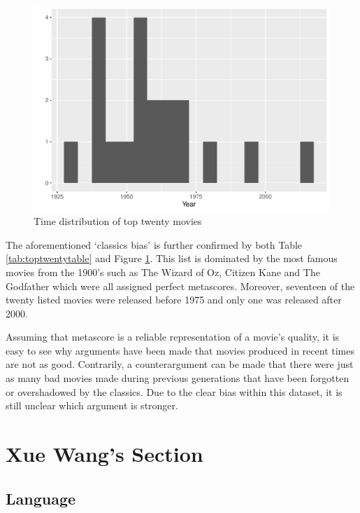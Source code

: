 \documentclass[11pt,a4paper,]{article}
\begin{document}
\begin{figure}
\centering
\includegraphics{Report_files/figure-latex/toptwentyhistogram-1.pdf}
\caption{\label{fig:toptwentyhistogram}Time distribution of top twenty movies}
\end{figure}

The aforementioned `classics bias' is further confirmed by both Table \ref{tab:toptwentytable} and Figure \ref{fig:toptwentyhistogram}. This list is dominated by the most famous movies from the 1900's such as The Wizard of Oz, Citizen Kane and The Godfather which were all assigned perfect metascores. Moreover, seventeen of the twenty listed movies were released before 1975 and only one was released after 2000.

Assuming that metascore is a reliable representation of a movie's quality, it is easy to see why arguments have been made that movies produced in recent times are not as good. Contrarily, a counterargument can be made that there were just as many bad movies made during previous generations that have been forgotten or overshadowed by the classics. Due to the clear bias within this dataset, it is still unclear which argument is stronger.

\hypertarget{xue-wangs-section}{%
\section{Xue Wang's Section}\label{xue-wangs-section}}

\hypertarget{language}{%
\subsection{Language}\label{language}}
\end{document}
